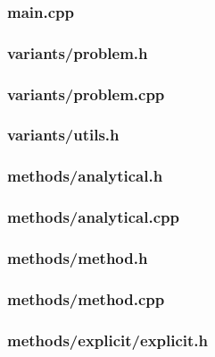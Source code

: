 \documentclass[12pt]{article}
\begin{document}
\subsubsection*{main.cpp}


\subsubsection*{variants/problem.h}


\subsubsection*{variants/problem.cpp}


\subsubsection*{variants/utils.h}


\subsubsection*{methods/analytical.h}


\subsubsection*{methods/analytical.cpp}


\subsubsection*{methods/method.h}


\subsubsection*{methods/method.cpp}


\subsubsection*{methods/explicit/explicit.h}

\end{document}
